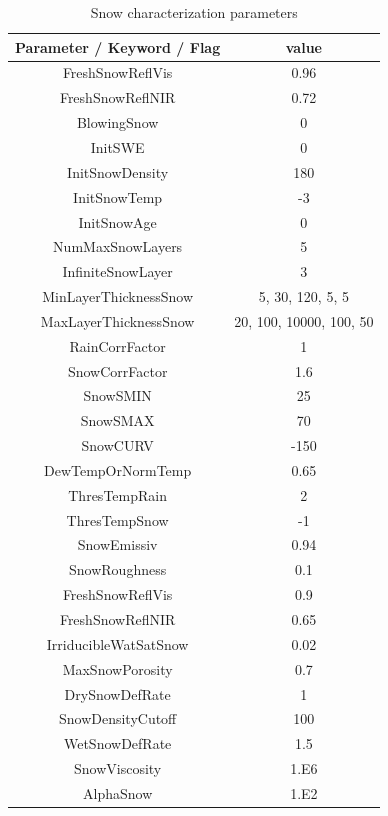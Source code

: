 \begin{table}[h!]
\begin{center}
\begin{tabular}[c]{|c|c|}
\hline
Parameter / Keyword / Flag & value\\
\hline
FreshSnowReflVis&0.96 \\
FreshSnowReflNIR&0.72 \\
BlowingSnow&0 \\
InitSWE & 0 \\
InitSnowDensity & 180 \\
InitSnowTemp & -3 \\
InitSnowAge & 0 \\
\hline
NumMaxSnowLayers & 5 \\
InfiniteSnowLayer & 3 \\
MinLayerThicknessSnow & 5,  30,  120,  5,  5 \\
MaxLayerThicknessSnow & 20, 100, 10000, 100, 50 \\
\hline
RainCorrFactor &1 \\
SnowCorrFactor &1.6 \\
\hline
SnowSMIN &25 \\
SnowSMAX &70 \\
SnowCURV &-150 \\
\hline
DewTempOrNormTemp & 0.65 \\
ThresTempRain & 2 \\
ThresTempSnow & -1 \\
SnowEmissiv & 0.94 \\
\hline
SnowRoughness & 0.1 \\
FreshSnowReflVis & 0.9 \\
FreshSnowReflNIR & 0.65 \\
IrriducibleWatSatSnow & 0.02 \\
MaxSnowPorosity &0.7 \\
DrySnowDefRate & 1 \\
SnowDensityCutoff & 100 \\
WetSnowDefRate & 1.5 \\
SnowViscosity & 1.E6 \\
AlphaSnow & 1.E2 \\
\hline
\end{tabular}
\caption{Snow characterization parameters}
\label{tab:snowPar}
\end{center}
\end{table}
\clearpage

